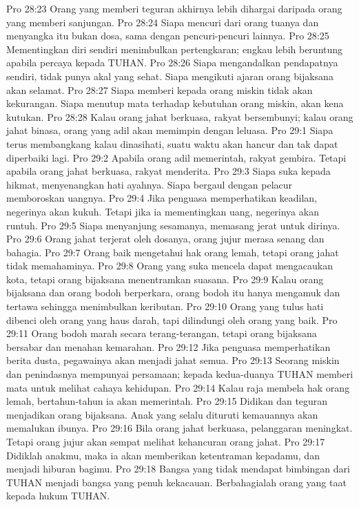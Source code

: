 Pro 28:23  Orang yang memberi teguran akhirnya lebih dihargai daripada orang yang memberi sanjungan.
Pro 28:24  Siapa mencuri dari orang tuanya dan menyangka itu bukan dosa, sama dengan pencuri-pencuri lainnya.
Pro 28:25  Mementingkan diri sendiri menimbulkan pertengkaran; engkau lebih beruntung apabila percaya kepada TUHAN.
Pro 28:26  Siapa mengandalkan pendapatnya sendiri, tidak punya akal yang sehat. Siapa mengikuti ajaran orang bijaksana akan selamat.
Pro 28:27  Siapa memberi kepada orang miskin tidak akan kekurangan. Siapa menutup mata terhadap kebutuhan orang miskin, akan kena kutukan.
Pro 28:28  Kalau orang jahat berkuasa, rakyat bersembunyi; kalau orang jahat binasa, orang yang adil akan memimpin dengan leluasa.
Pro 29:1  Siapa terus membangkang kalau dinasihati, suatu waktu akan hancur dan tak dapat diperbaiki lagi.
Pro 29:2  Apabila orang adil memerintah, rakyat gembira. Tetapi apabila orang jahat berkuasa, rakyat menderita.
Pro 29:3  Siapa suka kepada hikmat, menyenangkan hati ayahnya. Siapa bergaul dengan pelacur memboroskan uangnya.
Pro 29:4  Jika penguasa memperhatikan keadilan, negerinya akan kukuh. Tetapi jika ia mementingkan uang, negerinya akan runtuh.
Pro 29:5  Siapa menyanjung sesamanya, memasang jerat untuk dirinya.
Pro 29:6  Orang jahat terjerat oleh dosanya, orang jujur merasa senang dan bahagia.
Pro 29:7  Orang baik mengetahui hak orang lemah, tetapi orang jahat tidak memahaminya.
Pro 29:8  Orang yang suka mencela dapat mengacaukan kota, tetapi orang bijaksana menentramkan suasana.
Pro 29:9  Kalau orang bijaksana dan orang bodoh berperkara, orang bodoh itu hanya mengamuk dan tertawa sehingga menimbulkan keributan.
Pro 29:10  Orang yang tulus hati dibenci oleh orang yang haus darah, tapi dilindungi oleh orang yang baik.
Pro 29:11  Orang bodoh marah secara terang-terangan, tetapi orang bijaksana bersabar dan menahan kemarahan.
Pro 29:12  Jika penguasa memperhatikan berita dusta, pegawainya akan menjadi jahat semua.
Pro 29:13  Seorang miskin dan penindasnya mempunyai persamaan; kepada kedua-duanya TUHAN memberi mata untuk melihat cahaya kehidupan.
Pro 29:14  Kalau raja membela hak orang lemah, bertahun-tahun ia akan memerintah.
Pro 29:15  Didikan dan teguran menjadikan orang bijaksana. Anak yang selalu dituruti kemauannya akan memalukan ibunya.
Pro 29:16  Bila orang jahat berkuasa, pelanggaran meningkat. Tetapi orang jujur akan sempat melihat kehancuran orang jahat.
Pro 29:17  Didiklah anakmu, maka ia akan memberikan ketentraman kepadamu, dan menjadi hiburan bagimu.
Pro 29:18  Bangsa yang tidak mendapat bimbingan dari TUHAN menjadi bangsa yang penuh kekacauan. Berbahagialah orang yang taat kepada hukum TUHAN.
